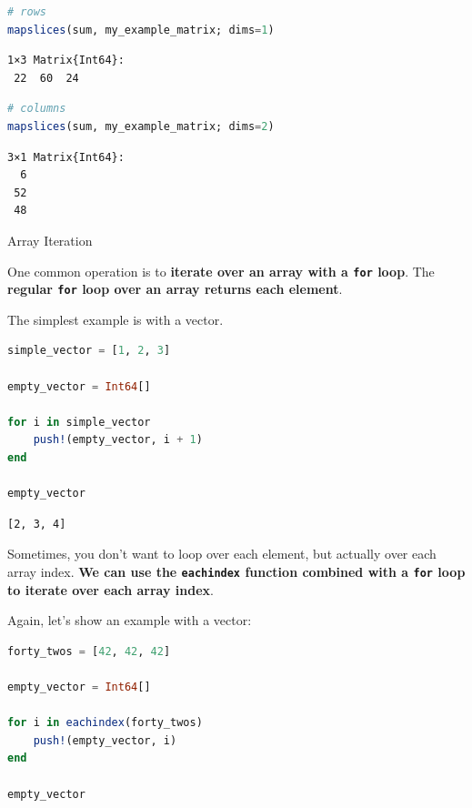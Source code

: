 \documentclass[
  notoc %
]{tufte-book}
\makeatletter
\newcommand{\passthrough}[1]{#1}
\renewcommand\subsubsection{%
\@startsection{subsubsection}{3}{\z@ }{-3.25ex\@plus -1ex \@minus -.2ex}{1.5ex \@plus .2ex}{\normalfont \normalsize \bfseries }
}
\makeatother
\begin{document}
\begin{lstlisting}[language=Julia]
# rows
mapslices(sum, my_example_matrix; dims=1)
\end{lstlisting}

\begin{lstlisting}[language=Output]
1×3 Matrix{Int64}:
 22  60  24
\end{lstlisting}

\begin{lstlisting}[language=Julia]
# columns
mapslices(sum, my_example_matrix; dims=2)
\end{lstlisting}

\begin{lstlisting}[language=Output]
3×1 Matrix{Int64}:
  6
 52
 48
\end{lstlisting}

\hypertarget{sec:array_iteration}{%
\subsubsection{Array Iteration}\label{sec:array_iteration}}

One common operation is to \textbf{iterate over an array with a
\passthrough{\lstinline!for!} loop}. The \textbf{regular
\passthrough{\lstinline!for!} loop over an array returns each element}.

The simplest example is with a vector.

\begin{lstlisting}[language=Julia]
simple_vector = [1, 2, 3]

empty_vector = Int64[]

for i in simple_vector
    push!(empty_vector, i + 1)
end

empty_vector
\end{lstlisting}

\begin{lstlisting}[language=Output]
[2, 3, 4]
\end{lstlisting}

Sometimes, you don't want to loop over each element, but actually over
each array index. \textbf{We can use the
\passthrough{\lstinline!eachindex!} function combined with a
\passthrough{\lstinline!for!} loop to iterate over each array index}.

Again, let's show an example with a vector:

\begin{lstlisting}[language=Julia]
forty_twos = [42, 42, 42]

empty_vector = Int64[]

for i in eachindex(forty_twos)
    push!(empty_vector, i)
end

empty_vector
\end{lstlisting}
\end{document}
